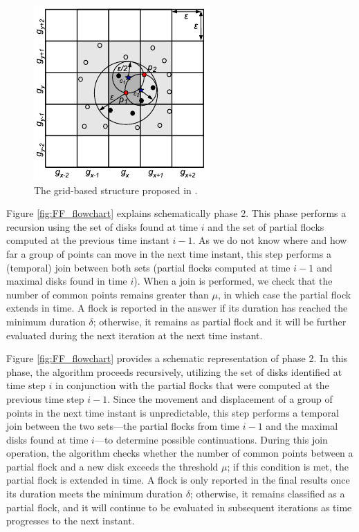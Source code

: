 \begin{figure}
    \centering
    \includegraphics[width=0.6\linewidth]{chapter4/figures/grid2}
    \caption{The grid-based structure proposed in \cite{vieira_2009}.}\label{fig:grid}
\end{figure}

Figure \ref{fig:FF_flowchart} explains schematically phase 2. This phase performs a recursion using the set of disks found at time $i$ and the set of partial flocks computed at the  previous time instant $i-1$.  As we do not know where and how far a group of points can move in the next time instant, this step performs a (temporal) join between both sets (partial flocks computed at time $i-1$ and maximal disks found in time $i$).  When a join is performed, we check that the number of common points remains greater than $\mu$, in which case the partial flock extends in time. A flock is reported in the answer if its duration has reached the minimum duration $\delta$; otherwise, it remains as partial flock and it will be further evaluated during the next iteration at the next time instant.

Figure \ref{fig:FF_flowchart} provides a schematic representation of phase 2. In this phase, the algorithm proceeds recursively, utilizing the set of disks identified at time step $i$ in conjunction with the partial flocks that were computed at the previous time step $i-1$. Since the movement and displacement of a group of points in the next time instant is unpredictable, this step performs a temporal join between the two sets—the partial flocks from time $i-1$ and the maximal disks found at time $i$—to determine possible continuations. During this join operation, the algorithm checks whether the number of common points between a partial flock and a new disk exceeds the threshold $\mu$; if this condition is met, the partial flock is extended in time. A flock is only reported in the final results once its duration meets the minimum duration $\delta$; otherwise, it remains classified as a partial flock, and it will continue to be evaluated in subsequent iterations as time progresses to the next instant.


